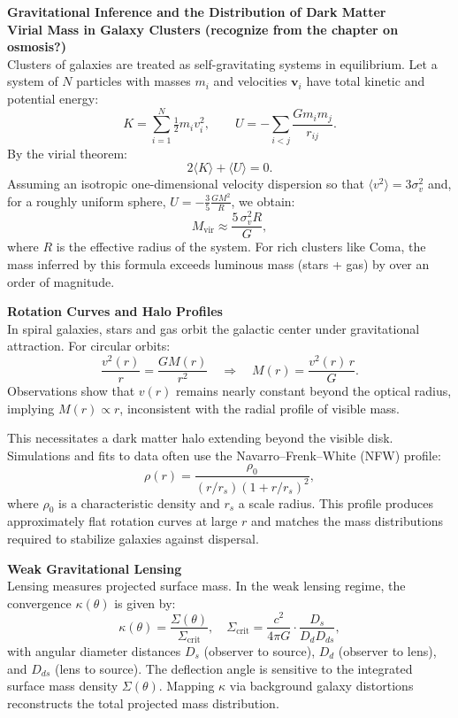\begin{technical}
{\Large\textbf{Gravitational Inference and the Distribution of Dark Matter}}\\[0.3em]

\noindent\textbf{Virial Mass in Galaxy Clusters (recognize from the chapter on osmosis?)}\\[0.25em]
Clusters of galaxies are treated as self-gravitating systems in equilibrium. Let a system of \( N \) particles with masses \( m_i \) and velocities \( \mathbf{v}_i \) have total kinetic and potential energy:
\[
K = \sum_{i=1}^N \tfrac{1}{2} m_i v_i^2, \qquad
U = - \sum_{i<j} \frac{G m_i m_j}{r_{ij}}.
\]
By the virial theorem:
\[
2\langle K \rangle + \langle U \rangle = 0.
\]
Assuming an isotropic one-dimensional velocity dispersion so that \( \langle v^2 \rangle = 3\sigma_v^2 \) and, for a roughly uniform sphere, \( U = - \tfrac{3}{5}\tfrac{G M^2}{R} \), we obtain:
\[
M_{\text{vir}} \approx \frac{5\,\sigma_v^2 R}{G},
\]
where \( R \) is the effective radius of the system. For rich clusters like Coma, the mass inferred by this formula exceeds luminous mass (stars + gas) by over an order of magnitude.

\noindent\textbf{Rotation Curves and Halo Profiles}\\[0.25em]
In spiral galaxies, stars and gas orbit the galactic center under gravitational attraction. For circular orbits:
\[
\frac{v^2(r)}{r} = \frac{G M(r)}{r^2} \quad \Rightarrow \quad M(r) = \frac{v^2(r)\,r}{G}.
\]
Observations show that \( v(r) \) remains nearly constant beyond the optical radius, implying \( M(r) \propto r \), inconsistent with the radial profile of visible mass.

This necessitates a dark matter halo extending beyond the visible disk. Simulations and fits to data often use the Navarro–Frenk–White (NFW) profile:
\[
\rho(r) = \frac{\rho_0}{(r/r_s)(1 + r/r_s)^2},
\]
where \( \rho_0 \) is a characteristic density and \( r_s \) a scale radius. This profile produces approximately flat rotation curves at large \( r \) and matches the mass distributions required to stabilize galaxies against dispersal.

\noindent\textbf{Weak Gravitational Lensing}\\[0.25em]
Lensing measures projected surface mass. In the weak lensing regime, the convergence \( \kappa(\theta) \) is given by:
\[
\kappa(\theta) = \frac{\Sigma(\theta)}{\Sigma_{\text{crit}}}, \quad
\Sigma_{\text{crit}} = \frac{c^2}{4\pi G} \cdot \frac{D_s}{D_d D_{ds}},
\]
with angular diameter distances \( D_s \) (observer to source), \( D_d \) (observer to lens), and \( D_{ds} \) (lens to source). The deflection angle is sensitive to the integrated surface mass density \( \Sigma(\theta) \). Mapping \( \kappa \) via background galaxy distortions reconstructs the total projected mass distribution.


\end{technical}
